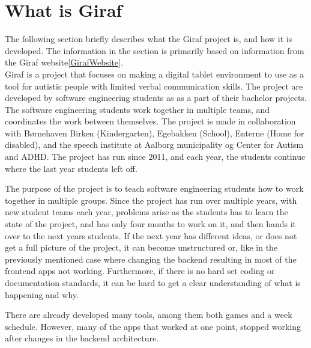 \section{What is Giraf} %
\label{cha:What is Giraf}

The following section briefly describes what the Giraf project is, and how it is developed. The information in the section is primarily based on information from the Giraf website\ref{GirafWebsite}.
\\
Giraf is a project that focuses on making a digital tablet environment to use as a tool for autistic people with limited verbal communication skills. The project are developed by software engineering students as as a part of their bachelor projects.  The software engineering students work together in multiple teams, and coordinates the work between themselves. The project is made in collaboration with Børnehaven Birken (Kindergarten)\cite{bhBirken}, Egebakken (School)\cite{egebakken}, Enterne (Home for disabled)\cite{enterne}, and the speech institute at Aalborg municipality og Center for Autism and ADHD\cite{center_for_autism}. The project has run since 2011, and each year, the students continue where the last year students left off. 

The purpose of the project is to teach software engineering students how to work together in multiple groups. Since the project has run over multiple years, with new student teams each year, problems arise as the students has to learn the state of the project, and has only four months to work on it, and then hands it over to the next years students. If the next year has different ideas, or does not get a full picture of the project, it can become unstructured or, like in the previously mentioned case where changing the backend resulting in most of the frontend apps not working. Furthermore, if there is no hard set coding or documentation standards, it can be hard to get a clear understanding of what is happening and why.

There are already developed many tools, among them both games and a week schedule. However, many of the apps that worked at one point, stopped working after changes in the backend architecture\cite{AppsStatus2019}. 